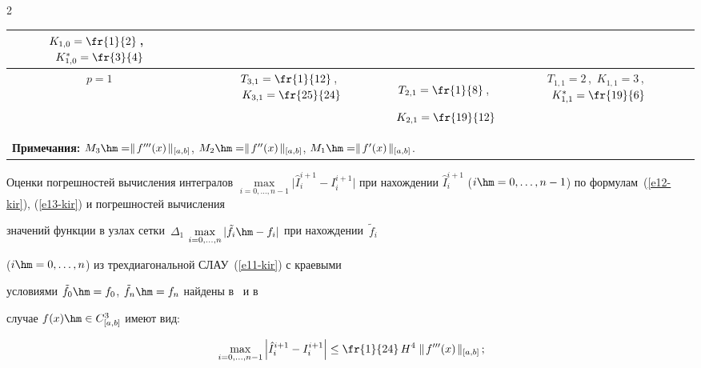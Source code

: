\begin{multicols}{2}
\begin{table}
\begin{center}
\begin{tabular}{|c|c|c|c|}
$K_{1,0}=\fr{1}{2}$\,,\ $K^*_{1,0}=\fr{3}{4}$\\


\hline


$p=1$ & $T_{3,1}=\fr{1}{12}$\,,\ $K_{3,1}=\fr{25}{24}$&$T_{2,1}=\fr{1}{8}$\,,\ 


$K_{2,1}=\fr{19}{12}$ &$T_{1,1}=2$\,,\ $K_{1,1}=3$\,,\ $K^*_{1,1}=\fr{19}{6}$\\


\hline


  \multicolumn{4}{l}{\footnotesize \textbf{Примечания:} $M_3\hm=\parallel\! 


f^{\prime\prime\prime}(x)\!\parallel_{[a,b]}$, $M_2\hm= \parallel \!


f^{\prime\prime}(x)\!\parallel_{[a,b]}$, $M_1\hm= \parallel \!


f^\prime(x)\!\parallel_{[a,b]}$.}\\


  \end{tabular}


  \end{center}


  \end{table}


  


  Оценки погрешностей вычисления интегралов $\max\limits_{i=0,\ldots ,n-1} 


\vert \hat{I}_i^{i+1}-I_i^{i+1}\vert$ при нахождении $\hat{I}_i^{i+1}$ ($i\hm=0,\ldots , 


n-1$) по формулам~(\ref{e12-kir}), (\ref{e13-kir}) и погрешностей вычисления 


значений функции в узлах сетки~$\Delta_1$ $\max\limits_{i=0,\ldots ,n} \vert 


\tilde{f}_i\hm- f_i\vert$ при нахождении~$\tilde{f}_i$ 


  ($i\hm=0,\ldots ,n$) из трехдиагональной СЛАУ~(\ref{e11-kir}) с краевы\-ми 


условиями $\tilde{f}_0\hm=f_0$, $\tilde{f}_n\hm=f_n$ найдены в~\cite{8-kir} и в 


случае $f(x)\hm\in C^3_{[a,b]}$ имеют вид:


  \begin{align}


 & \max\limits_{i=0,\ldots , n-1}\left\vert \hat{I}_i^{i+1} -I_i^{i+1}\right\vert \leq  


\fr{1}{24}\,H^4 \parallel\! f^{\prime\prime\prime}(x)\!\parallel_{[a,b]}\,; \label{e20-kir}\\ 



\end{align}
\end{multicols}
